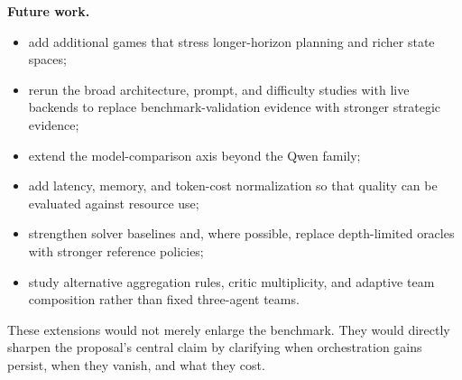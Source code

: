 \documentclass[11pt]{article}
\begin{document}
\textbf{Future work.}
\begin{itemize}
  \item add additional games that stress longer-horizon planning and richer state spaces;
  \item rerun the broad architecture, prompt, and difficulty studies with live backends to replace benchmark-validation evidence with stronger strategic evidence;
  \item extend the model-comparison axis beyond the Qwen family;
  \item add latency, memory, and token-cost normalization so that quality can be evaluated against resource use;
  \item strengthen solver baselines and, where possible, replace depth-limited oracles with stronger reference policies;
  \item study alternative aggregation rules, critic multiplicity, and adaptive team composition rather than fixed three-agent teams.
\end{itemize}

These extensions would not merely enlarge the benchmark. They would directly sharpen the proposal's central claim by clarifying when orchestration gains persist, when they vanish, and what they cost.
\end{document}
